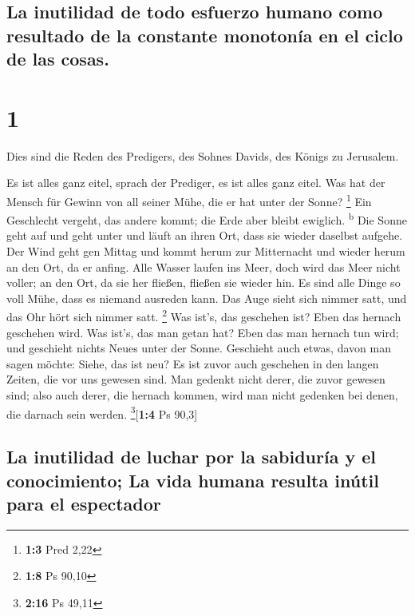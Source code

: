 \hypertarget{la-inutilidad-de-todo-esfuerzo-humano-como-resultado-de-la-constante-monotonuxeda-en-el-ciclo-de-las-cosas.}{%
\subsection{La inutilidad de todo esfuerzo humano como resultado de la
constante monotonía en el ciclo de las
cosas.}\label{la-inutilidad-de-todo-esfuerzo-humano-como-resultado-de-la-constante-monotonuxeda-en-el-ciclo-de-las-cosas.}}

\hypertarget{section}{%
\section{1}\label{section}}

 Dies sind die Reden des Predigers, des Sohnes Davids, des
Königs zu Jerusalem.

 Es ist alles ganz eitel, sprach der Prediger, es ist
alles ganz eitel.  Was hat der Mensch für Gewinn von all
seiner Mühe, die er hat unter der Sonne? \footnote{\textbf{1:3} Pred
  2,22}  Ein Geschlecht vergeht, das andere kommt; die
Erde aber bleibt ewiglich. \textsuperscript{b}  Die Sonne
geht auf und geht unter und läuft an ihren Ort, dass sie wieder daselbst
aufgehe.  Der Wind geht gen Mittag und kommt herum zur
Mitternacht und wieder herum an den Ort, da er anfing. 
Alle Wasser laufen ins Meer, doch wird das Meer nicht voller; an den
Ort, da sie her fließen, fließen sie wieder hin.  Es sind
alle Dinge so voll Mühe, dass es niemand ausreden kann. Das Auge sieht
sich nimmer satt, und das Ohr hört sich nimmer satt. \footnote{\textbf{1:8}
  Ps 90,10}  Was ist's, das geschehen ist? Eben das
hernach geschehen wird. Was ist's, das man getan hat? Eben das man
hernach tun wird; und geschieht nichts Neues unter der Sonne.
 Geschieht auch etwas, davon man sagen möchte: Siehe, das
ist neu? Es ist zuvor auch geschehen in den langen Zeiten, die vor uns
gewesen sind.  Man gedenkt nicht derer, die zuvor gewesen
sind; also auch derer, die hernach kommen, wird man nicht gedenken bei
denen, die darnach sein werden. \footnote{\textbf{2:16} Ps 49,11}{[}\textbf{1:4}
Ps 90,3{]}

\hypertarget{la-inutilidad-de-luchar-por-la-sabiduruxeda-y-el-conocimiento-la-vida-humana-resulta-inuxfatil-para-el-espectador}{%
\subsection{La inutilidad de luchar por la sabiduría y el conocimiento;
La vida humana resulta inútil para el
espectador}\label{la-inutilidad-de-luchar-por-la-sabiduruxeda-y-el-conocimiento-la-vida-humana-resulta-inuxfatil-para-el-espectador}}

